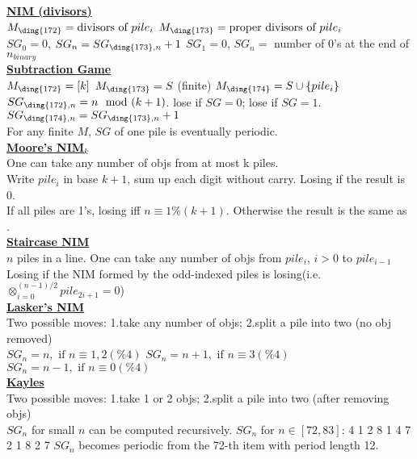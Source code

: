 \underline{\textbf{NIM (divisors)}}\\
$M_{\text{\ding{172}}} = \text{divisors of } pile_i$ \newline $M_{\text{\ding{173}}} = \text{proper divisors of }pile_i$\\
$SG_0 = 0$, $SG_n = SG_{\text{\ding{173}},n} + 1$ \newline {}$SG_1=0$, $SG_n=$ number of 0's at the end of $n_{binary}$\\

\underline{\textbf{Subtraction Game}}\\
$M_{\text{\ding{172}}} = [k]$ $M_{\text{\ding{173}}} = S$ (finite) $M_{\text{\ding{174}}} = S \cup \{pile_i\}$\\
$SG_{\text{\ding{172}},n} = n \mod (k+1)$. lose if $SG=0$; lose if $SG=1$. $SG_{\text{\ding{174}},n} = SG_{\text{\ding{173}},n}+1$\\
For any finite $M$, $SG$ of one pile is eventually periodic.
\\

\underline{\textbf{Moore's NIM$_k$}}\\
One can take any number of objs from at most k piles.\\
Write $pile_i$ in base $k+1$, sum up each digit without carry. Losing if the result is 0.\\
 If all piles are 1's, losing iff $n\equiv 1\%(k+1)$. Otherwise the result is the same as .
\\ 

\underline{\textbf{Staircase NIM}}\\
	$n$ piles in a line. One can take any number of objs from $pile_i$, $i>0$ to $pile_{i-1}$\\
	Losing if the NIM formed by the odd-indexed piles is losing(i.e. $\otimes_{i=0}^{(n-1)/2} pile_{2i+1}=0$)
	\\ 
	
	\underline{\textbf{Lasker's NIM}}\\
	Two possible moves: 1.take any number of objs; 2.split a pile into two (no obj removed) \\
	$SG_n = n, \text{ if }n\equiv 1,2(\% 4)$ $SG_n = n+1, \text{ if }n\equiv3(\% 4)$ $SG_n = n-1, \text{ if }n\equiv0(\% 4)$
	\\ 
	
	\underline{\textbf{Kayles}} \\
	Two possible moves: 1.take 1 or 2 objs; 2.split a pile into two (after removing objs) \\
	$SG_n$ for small $n$ can be computed recursively. $SG_n$ for $n \in [72,83]$: 4 1 2 8 1 4 7 2 1 8 2 7
	$SG_n$ becomes periodic from the 72-th item with period length 12.
	\\ 
	
